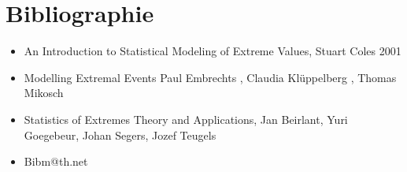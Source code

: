 \documentclass{article}
\theoremstyle{plain}
\theoremstyle{definition}
\theoremstyle{plain}
\begin{document}
\newpage
\section*{Bibliographie}

\begin{itemize}
	\item An Introduction to Statistical Modeling of Extreme Values, Stuart Coles 2001
	\item Modelling Extremal Events  Paul Embrechts , Claudia Klüppelberg , Thomas Mikosch
	\item Statistics of Extremes Theory and Applications, Jan Beirlant, Yuri Goegebeur, Johan Segers, Jozef Teugels
	\item Bibm@th.net
\end{itemize}
\end{document}
